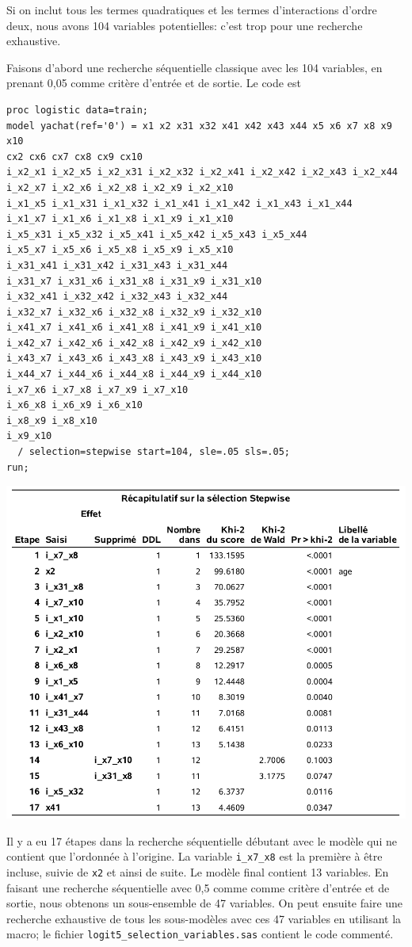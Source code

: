 \documentclass[
  11pt,
  letterpaper,
]{book}
\theoremstyle{definition}
\theoremstyle{definition}
\theoremstyle{definition}
\theoremstyle{remark}
\begin{document}
Si on inclut tous les termes quadratiques et les termes d'interactions d'ordre deux, nous avons 104 variables potentielles: c'est trop pour une recherche exhaustive.

Faisons d'abord une recherche séquentielle classique avec les 104 variables, en prenant 0,05 comme critère d'entrée et de sortie. Le code est

\begin{verbatim}
proc logistic data=train;
model yachat(ref='0') = x1 x2 x31 x32 x41 x42 x43 x44 x5 x6 x7 x8 x9 x10
cx2 cx6 cx7 cx8 cx9 cx10
i_x2_x1 i_x2_x5 i_x2_x31 i_x2_x32 i_x2_x41 i_x2_x42 i_x2_x43 i_x2_x44
i_x2_x7 i_x2_x6 i_x2_x8 i_x2_x9 i_x2_x10
i_x1_x5 i_x1_x31 i_x1_x32 i_x1_x41 i_x1_x42 i_x1_x43 i_x1_x44
i_x1_x7 i_x1_x6 i_x1_x8 i_x1_x9 i_x1_x10
i_x5_x31 i_x5_x32 i_x5_x41 i_x5_x42 i_x5_x43 i_x5_x44
i_x5_x7 i_x5_x6 i_x5_x8 i_x5_x9 i_x5_x10
i_x31_x41 i_x31_x42 i_x31_x43 i_x31_x44
i_x31_x7 i_x31_x6 i_x31_x8 i_x31_x9 i_x31_x10
i_x32_x41 i_x32_x42 i_x32_x43 i_x32_x44
i_x32_x7 i_x32_x6 i_x32_x8 i_x32_x9 i_x32_x10
i_x41_x7 i_x41_x6 i_x41_x8 i_x41_x9 i_x41_x10
i_x42_x7 i_x42_x6 i_x42_x8 i_x42_x9 i_x42_x10
i_x43_x7 i_x43_x6 i_x43_x8 i_x43_x9 i_x43_x10
i_x44_x7 i_x44_x6 i_x44_x8 i_x44_x9 i_x44_x10
i_x7_x6 i_x7_x8 i_x7_x9 i_x7_x10
i_x6_x8 i_x6_x9 i_x6_x10
i_x8_x9 i_x8_x10
i_x9_x10 
  / selection=stepwise start=104, sle=.05 sls=.05;  
run;
\end{verbatim}

\begin{center}\includegraphics[width=0.8\linewidth]{figures/03-logistic-e22} \end{center}

Il y a eu 17 étapes dans la recherche séquentielle débutant avec le modèle qui ne contient que l'ordonnée à l'origine. La variable \texttt{i\_x7\_x8} est la première à être incluse, suivie de \texttt{x2} et ainsi de suite. Le modèle final contient 13 variables.
En faisant une recherche séquentielle avec 0,5 comme comme critère d'entrée et de sortie, nous obtenons un sous-ensemble de 47 variables. On peut ensuite faire une recherche exhaustive de tous les sous-modèles avec ces 47 variables en utilisant la macro; le fichier \texttt{logit5\_selection\_variables.sas} contient le code commenté.
\end{document}
